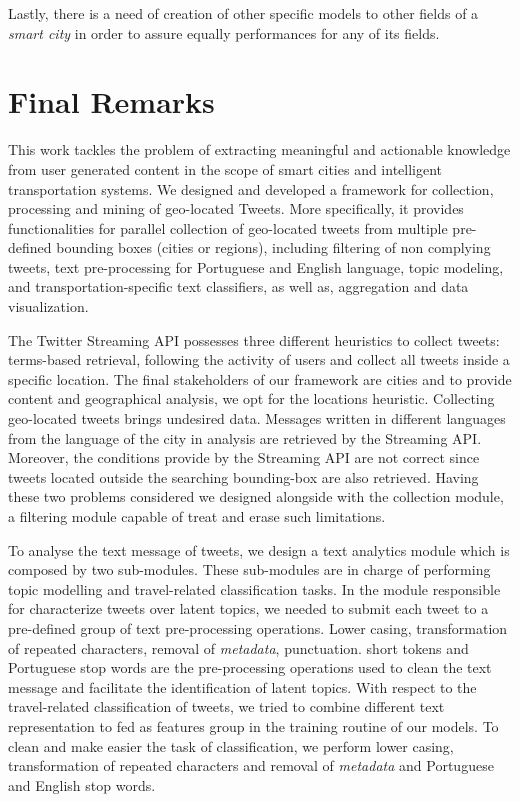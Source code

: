 Lastly, there is a need of creation of other specific models to other fields of a \textit{smart city} in order to assure equally performances for any of its fields.
\fi

\section{Final Remarks}

This work tackles the problem of extracting meaningful and actionable knowledge from user generated content in the scope of smart cities and intelligent transportation systems. We designed and developed a framework for collection, processing and mining of geo-located Tweets. More specifically, it provides functionalities for parallel collection of geo-located tweets from multiple pre-defined bounding boxes (cities or regions), including filtering of non complying tweets, text pre-processing for Portuguese and English language, topic modeling, and transportation-specific text classifiers, as well as, aggregation and data visualization.

The Twitter Streaming API possesses three different heuristics to collect tweets: terms-based retrieval, following the activity of users and collect all tweets inside a specific location. The final stakeholders of our framework are cities and to provide content and geographical analysis, we opt for the locations heuristic. Collecting geo-located tweets brings undesired data. Messages written in different languages from the language of the city in analysis are retrieved by the Streaming API. Moreover, the conditions provide by the Streaming API are not correct since tweets located outside the searching bounding-box are also retrieved. Having these two problems considered we designed alongside with the collection module, a filtering module capable of treat and erase such limitations.

To analyse the text message of tweets, we design a text analytics module which is composed by two sub-modules. These sub-modules are in charge of performing topic modelling and travel-related classification tasks. In the module responsible for characterize tweets over latent topics, we needed to submit each tweet to a pre-defined group of text pre-processing operations. Lower casing, transformation of repeated characters, removal of \textit{metadata}, punctuation. short tokens and Portuguese stop words are the pre-processing operations used to clean the text message and facilitate the identification of latent topics. With respect to the travel-related classification of tweets, we tried to combine different text representation to fed as features group in the training routine of our models. To clean and make easier the task of classification, we perform lower casing, transformation of repeated characters and removal of \textit{metadata} and Portuguese and English stop words. 

